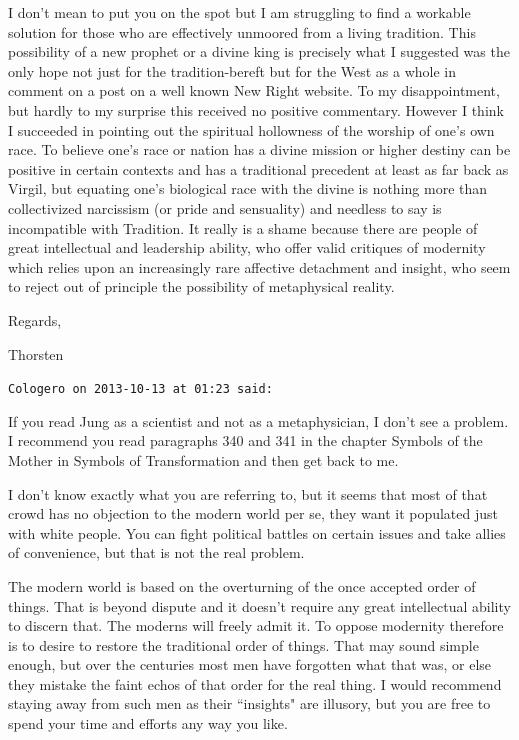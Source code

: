 \begin{footnotesize}
\begin{sffamily}
I don't mean to put you on the spot but I am struggling to find a workable solution for those who
are effectively unmoored from a living tradition. This possibility of a new prophet or a divine king is precisely what
I suggested was the only hope not just for the tradition-bereft but for the West as a whole in comment on a post on a
well known New Right website. To my disappointment, but hardly to my surprise this received no positive commentary.
However I think I succeeded in pointing out the spiritual hollowness of the worship of one's own
race. To believe one's race or nation has a divine mission or higher destiny can be positive in
certain contexts and has a traditional precedent at least as far back as Virgil, but equating
one's biological race with the divine is nothing more than collectivized narcissism (or pride and
sensuality) and needless to say is incompatible with Tradition. It really is a shame because there are people of great
intellectual and leadership ability, who offer valid critiques of modernity which relies upon an increasingly rare
affective detachment and insight, who seem to reject out of principle the possibility of metaphysical reality.

Regards,

Thorsten


\hfill

\texttt{Cologero on 2013-10-13 at 01:23 said: }

If you read Jung as a scientist and not as a metaphysician, I don't see a problem. I recommend you
read paragraphs 340 and 341 in the chapter Symbols of the Mother in Symbols of Transformation and then get back to me.

I don't know exactly what you are referring to, but it seems that most of that crowd has no
objection to the modern world per se, they want it populated just with white people. You can fight political battles on
certain issues and take allies of convenience, but that is not the real problem.

The modern world is based on the overturning of the once accepted order of things. That is beyond dispute and it
doesn't require any great intellectual ability to discern that. The moderns will freely admit it.
To oppose modernity therefore is to desire to restore the traditional order of things. That may sound simple enough,
but over the centuries most men have forgotten what that was, or else they mistake the faint echos of that order for
the real thing. I would recommend staying away from such men as their ``insights" are illusory, but you are free to
spend your time and efforts any way you like.


\end{sffamily}
\end{footnotesize}
